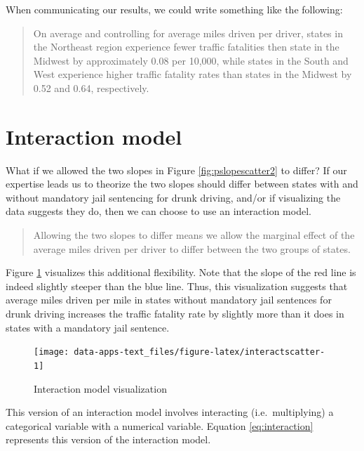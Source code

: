 \documentclass[
]{book}
\begin{document}
When communicating our results, we could write something like the following:

\begin{quote}
On average and controlling for average miles driven per driver, states in the Northeast region experience fewer traffic fatalities then state in the Midwest by approximately 0.08 per 10,000, while states in the South and West experience higher traffic fatality rates than states in the Midwest by 0.52 and 0.64, respectively.
\end{quote}

\hypertarget{interaction-model}{%
\section{Interaction model}\label{interaction-model}}

What if we allowed the two slopes in Figure \ref{fig:pslopescatter2} to differ? If our expertise leads us to theorize the two slopes should differ between states with and without mandatory jail sentencing for drunk driving, and/or if visualizing the data suggests they do, then we can choose to use an interaction model.

\begin{quote}
Allowing the two slopes to differ means we allow the marginal effect of the average miles driven per driver to differ between the two groups of states.
\end{quote}

Figure \ref{fig:interactscatter} visualizes this additional flexibility. Note that the slope of the red line is indeed slightly steeper than the blue line. Thus, this visualization suggests that average miles driven per mile in states without mandatory jail sentences for drunk driving increases the traffic fatality rate by slightly more than it does in states with a mandatory jail sentence.

\begin{figure}

{\centering \texttt{[image: data-apps-text\_files/figure-latex/interactscatter-1]} 

}

\caption{Interaction model visualization}\label{fig:interactscatter}
\end{figure}

This version of an interaction model involves interacting (i.e.~multiplying) a categorical variable with a numerical variable. Equation \eqref{eq:interaction} represents this version of the interaction model.
\end{document}
